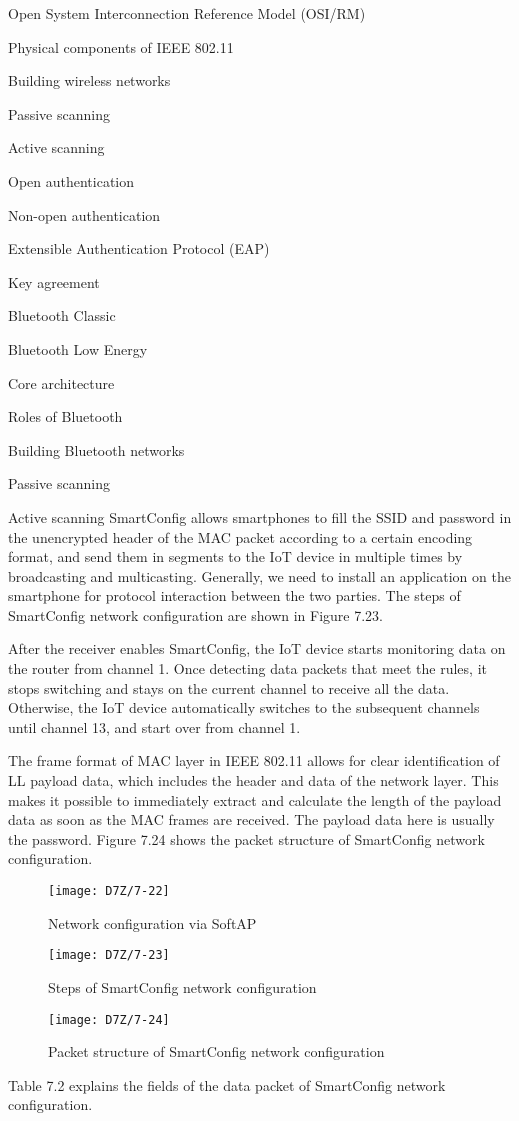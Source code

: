 \documentclass[a4paper,12pt]{book}
\begin{document}
\begin{term}{Open System Interconnection Reference Model (OSI/RM)}
\begin{term}{Physical components of IEEE 802.11}
\begin{term}{Building wireless networks}
\begin{term}{Passive scanning}
\begin{term}{Active scanning}
\begin{term}{Open authentication}
\begin{term}{Non-open authentication}
\begin{term}{Extensible Authentication Protocol (EAP)}
\begin{term}{Key agreement}
\begin{term}{Bluetooth Classic}
\begin{term}{Bluetooth Low Energy}
\begin{term}{Core architecture}
\begin{term}{Roles of Bluetooth}
\begin{term}{Building Bluetooth networks}
\begin{term}{Passive scanning}
\begin{term}{Active scanning}
SmartConfig allows smartphones to fill the SSID and password in the unencrypted header of the MAC packet according to a certain encoding format, and send them in segments to the IoT device in multiple times by broadcasting and multicasting. Generally, we need to install an application on the smartphone for protocol interaction between the two parties. The steps of SmartConfig network configuration are shown in Figure 7.23.

After the receiver enables SmartConfig, the IoT device starts monitoring data on the router from channel 1. Once detecting data packets that meet the rules, it stops switching and stays on the current channel to receive all the data. Otherwise, the IoT device automatically switches to the subsequent channels until channel 13, and start over from channel 1.

The frame format of MAC layer in IEEE 802.11 allows for clear identification of LL payload data, which includes the header and data of the network layer. This makes it possible to immediately extract and calculate the length of the payload data as soon as the MAC frames are received. The payload data here is usually the password. Figure 7.24 shows the packet structure of SmartConfig network configuration.

\begin{figure}[!h]
    \centering
    \texttt{[image: D7Z/7-22]}
    \caption{Network configuration via SoftAP}
\end{figure}

\begin{figure}[!h]
    \centering
    \texttt{[image: D7Z/7-23]}
    \caption{Steps of SmartConfig network configuration}
\end{figure}

\vspace{6pt}
\begin{figure}[!h]
    \centering
    \texttt{[image: D7Z/7-24]}
    \caption{Packet structure of SmartConfig network configuration}
\end{figure}

Table 7.2 explains the fields of the data packet of SmartConfig network configuration.


\end{term}
\end{term}
\end{term}
\end{term}
\end{term}
\end{term}
\end{term}
\end{term}
\end{term}
\end{term}
\end{term}
\end{term}
\end{term}
\end{term}
\end{term}
\end{term}
\end{document}
